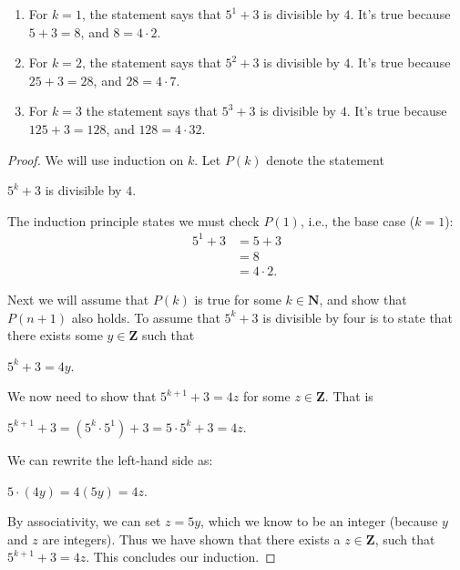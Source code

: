 \documentclass[12pt,oneside]{amsart}
\theoremstyle{remark}
\newcommand{\bfN}{\mathbf{N}}
\newcommand{\bfZ}{\mathbf{Z}}
\begin{document}
\begin{enumerate}
\item For $k=1$, the statement says that $5^1+3$ is divisible by $4$.
It's true because $5+3=8$, and $8 = 4 \cdot 2$.
\item For $k = 2$, the statement says that $5^2 + 3$ is divisible by $4$. It's true because $25 + 3 = 28$, and $28 = 4 \cdot 7$.
\item For $k = 3$ the statement says that $5^3 + 3$ is divisible by $4$. It's true because $125 + 3 = 128$, and $128 = 4 \cdot 32$.
\end{enumerate}
\begin{proof}
We will use induction on $k$. Let $P(k)$ denote the statement

$5^k + 3$ is divisible by $4$.

The induction principle states we must check $P(1)$, i.e., the base case ($k = 1$):
\begin{align*}
5^1 + 3 &= 5 + 3 \\
          &= 8 \\
          &= 4 \cdot 2.
\end{align*}

Next we will assume that $P(k)$ is true for some $k \in \bfN$, and show that $P(n + 1)$ also holds. To assume that $5^k + 3$ is divisible by four is to state that there exists some $y \in \bfZ$ such that

$5^k + 3 = 4y$.

We now need to show that $5^{k + 1} + 3 = 4z$ for some $z \in \bfZ$. That is

$5^{k + 1} + 3 = (5^k \cdot 5^1) + 3 = 5 \cdot 5^k + 3 = 4z$.

We can rewrite the left-hand side as:

$5 \cdot (4y) = 4(5y) = 4z$.

By associativity, we can set $z = 5y$, which we know to be an integer (because $y$ and $z$ are integers). Thus we have shown that there exists a $z \in \bfZ$, such that $5^{k + 1} + 3 = 4z$. This concludes our induction.
\end{proof}
\end{document}
